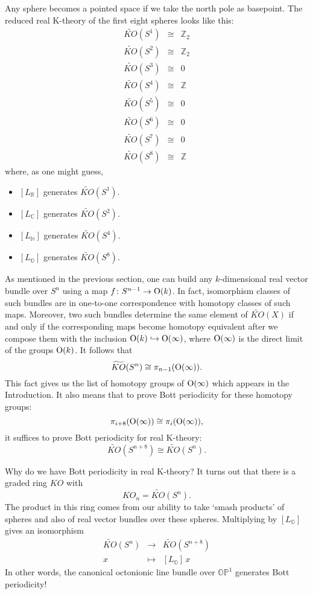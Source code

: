 \documentclass[12pt]{article}
\newcommand\Z{{\mathbb Z}}
\newcommand\R{{\mathbb R}}
\newcommand\C{{\mathbb C}}
\renewcommand\H{{\mathbb H}}
\renewcommand\O{{\mathbb O}}
\newcommand\OP{{\mathbb {OP}}}
\newcommand{\OO}{{\rm O}}
\newcommand{\iso}{\cong}
\newcommand{\ban}{\begin{eqnarray*}}
\newcommand{\ean}{\end{eqnarray*}}
\newcommand{\maps}{\colon}
\begin{document}
Any sphere becomes a pointed space if we take the north pole as
basepoint.  The reduced real K-theory of the first eight spheres 
looks like this:
\ban       
               \widetilde{KO}(S^1) &\iso& \Z_2  \\    
               \widetilde{KO}(S^2) &\iso& \Z_2  \\    
               \widetilde{KO}(S^3) &\iso& 0  \\    
               \widetilde{KO}(S^4) &\iso& \Z  \\    
               \widetilde{KO}(S^5) &\iso& 0  \\    
               \widetilde{KO}(S^6) &\iso& 0  \\    
               \widetilde{KO}(S^7) &\iso& 0  \\    
               \widetilde{KO}(S^8) &\iso& \Z  
\ean  
where, as one might guess, 
\begin{itemize}    
\item $[L_\R]$ generates $\widetilde{KO}(S^1)$.
\item $[L_\C]$ generates $\widetilde{KO}(S^2)$.
\item $[L_\H]$ generates $\widetilde{KO}(S^4)$.
\item $[L_\O]$ generates $\widetilde{KO}(S^8)$.
\end{itemize}
As mentioned in the previous section, one can build any $k$-dimensional
real vector bundle over $S^n$ using a map $f \maps S^{n-1} \to \OO(k)$.
In fact, isomorphism classes of such bundles are in one-to-one correspondence
with homotopy classes of such maps.  Moreover, two such bundles determine 
the same element of $\widetilde{KO}(X)$ if and only if the corresponding
maps become homotopy equivalent after we compose them with the 
inclusion $\OO(k) \hookrightarrow \OO(\infty)$, where 
$\OO(\infty)$ is the direct limit of the groups $\OO(k)$.   It follows that
\[        \widetilde{KO}(S^n) \iso \pi_{n-1}(\OO(\infty)) .\]
This fact gives us the list of homotopy groups of $\OO(\infty)$ which
appears in the Introduction.   It also means that to prove
Bott periodicity for these homotopy groups:
\[   \pi_{i+8}(\OO(\infty)) \iso \pi_i(\OO(\infty)),   \]   
it suffices to prove Bott periodicity for real K-theory:
\[     \widetilde{KO}(S^{n+8}) \iso \widetilde{KO}(S^n) . \]

Why do we have Bott periodicity in real K-theory?  It turns out
that there is a graded ring $KO$ with 
\[              KO_n = \widetilde{KO}(S^n)  .\]
The product in this ring comes from our ability to take
`smash products' of spheres and also of real vector bundles over these
spheres.  Multiplying by $[L_\O]$ gives an isomorphism
\[
\begin{array}{ccc}
       \widetilde{KO}(S^n) &\to& \widetilde{KO}(S^{n+8})  \\
                       x   &\mapsto& [L_\O] \,x 
\end{array}
\]
In other words, the canonical octonionic line bundle over $\OP^1$
generates Bott periodicity!
\end{document}
